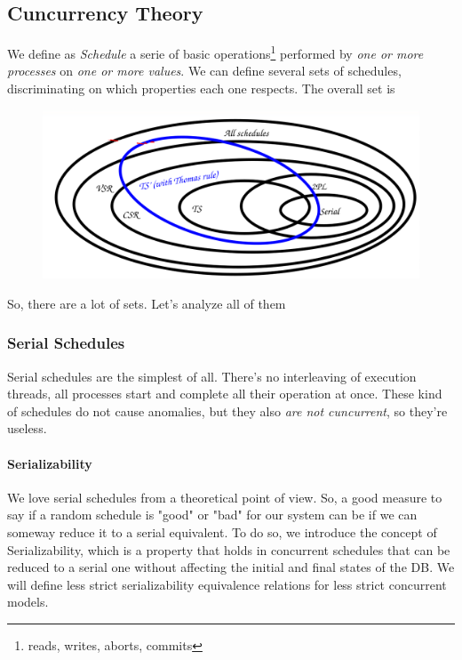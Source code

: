 \documentclass{article}
\begin{document}
			\subsection{Cuncurrency Theory}
				We define as \textit{Schedule} a serie of basic operations\footnote{reads, writes, aborts, commits} performed by \textit{one or more processes} on \textit{one or more values}. We can define several sets of schedules, discriminating on which properties each one respects. The overall set is
				\begin{figure}[H]
					\centering
					\includegraphics[width = \textwidth]{./images/ScheduleSets.png}
				\end{figure}
				So, there are a lot of sets. Let's analyze all of them
				
				\subsubsection{Serial Schedules}
					Serial schedules are the simplest of all. There's no interleaving of execution threads, all processes start and complete all their operation at once. These kind of schedules do not cause anomalies, but they also \textit{are not cuncurrent}, so they're useless.

					\paragraph{Serializability}
						We love serial schedules from a theoretical point of view. So, a good measure to say if a random schedule is "good" or "bad" for our system can be if we can someway reduce it to a serial equivalent. To do so, we introduce the concept of Serializability, which is a property that holds in concurrent schedules that can be reduced to a serial one without affecting the initial and final states of the DB. We will define less strict serializability equivalence relations for less strict concurrent models.
				
\end{document}
